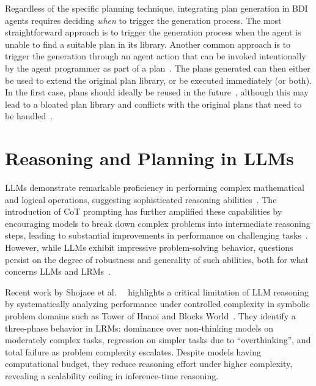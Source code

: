 \documentclass[12pt,a4paper,openright,twoside]{book}
\begin{document}
Regardless of the specific planning technique, integrating plan generation in \ac{BDI} agents requires deciding \emph{when} to trigger the generation process.
%
The most straightforward approach is to trigger the generation process when the agent is unable to find a suitable plan in its library.
%
Another common approach is to trigger the generation through an agent action that can be invoked intentionally by the agent programmer as part of a plan~\cite{meneguzzi2008dalt}.
%
The plans generated can then either be used to extend the original plan library, or be executed immediately (or both).
%
In the first case, plans should ideally be reused in the future~\cite{silva2009atal}, although this may lead to a bloated plan library and conflicts with the original plans that need to be handled~\cite{cardoso2019emas}.

\section{Reasoning and Planning in LLMs}\label{sec:llm-reasoning}

LLMs demonstrate remarkable proficiency in performing complex mathematical and logical operations, suggesting sophisticated reasoning abilities~\cite{huangReasoningLargeLanguage2023}.
%
The introduction of \ac{CoT} prompting has further amplified these capabilities by encouraging models to break down complex problems into intermediate reasoning steps, leading to substantial improvements in performance on challenging tasks~\cite{weiChainofThoughtPromptingElicits2023, kojimaLargeLanguageModels2023}.
%
However, while LLMs exhibit impressive problem-solving behavior, questions persist on the degree of robustness and generality of such abilities, both for what concerns \acp{LLM} and \acp{LRM}~\cite{mccoyEmbersAutoregressionUnderstanding2023, mccoyWhenLanguageModel2024, wuReasoningRecitingExploring2024}. 

Recent work by Shojaee et al.\ ~\cite{shojaeeIllusionThinkingUnderstanding} highlights a critical limitation of \ac{LLM} reasoning by systematically analyzing performance under controlled complexity in symbolic problem domains such as Tower of Hanoi and Blocks World~\cite{DBLP:journals/ai/SlaneyT01}.
%
They identify a three-phase behavior in \acp{LRM}: dominance over non-thinking models on moderately complex tasks, regression on simpler tasks due to ``overthinking'', and total failure as problem complexity escalates. Despite models having computational budget, they reduce reasoning effort under higher complexity, revealing a scalability ceiling in inference-time reasoning.
\end{document}
